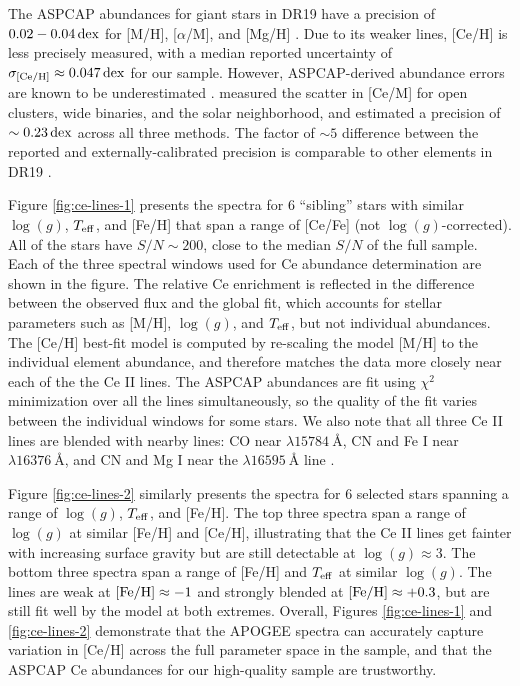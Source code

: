 \documentclass[twocolumn,twocolappendix]{aastex701}
\newcommand{\bracket}[2][H]{{\rm [#2/#1]}}
\newcommand{\dex}{\,{\rm dex}}
\begin{document}
The ASPCAP abundances for giant stars in DR19 have a precision of $0.02-0.04\dex$ for [M/H], [$\alpha$/M], and [Mg/H] \citep{meszaros_sdss-v_2025}. Due to its weaker lines, [Ce/H] is less precisely measured, with a median reported uncertainty  of $\sigma_{\bracket{Ce}}\approx0.047\dex$ for our sample. However, ASPCAP-derived abundance errors are known to be underestimated \citep[see][]{pinsonneault_apokasc-3_2025}. \citet{meszaros_sdss-v_2025} measured the scatter in [Ce/M] for open clusters, wide binaries, and the solar neighborhood, and estimated a precision of $\sim0.23\dex$ across all three methods.  The factor of $\sim5$ difference between the reported and externally-calibrated precision is comparable to other elements in DR19 \citep{meszaros_sdss-v_2025}.

Figure \ref{fig:ce-lines-1} presents the spectra for 6 ``sibling'' stars with similar $\log(g)$, $T_{\rm eff}$, and [Fe/H] that span a range of [Ce/Fe] (not $\log(g)$-corrected). All of the stars have $S/N\sim200$, close to the median $S/N$ of the full sample. Each of the three spectral windows used for Ce abundance determination are shown in the figure. The relative Ce enrichment is reflected in the difference between the observed flux and the global fit, which accounts for stellar parameters such as [M/H], $\log(g)$, and $T_{\rm eff}$, but not individual abundances. The [Ce/H] best-fit model is computed by re-scaling the model [M/H] to the individual element abundance, and therefore matches the data more closely near each of the the Ce II lines. The ASPCAP abundances are fit using $\chi^2$ minimization over all the lines simultaneously, so the quality of the fit varies between the individual windows for some stars. We also note that all three Ce II lines are blended with nearby lines: CO near $\lambda\SI{15784}{\angstrom}$, CN and Fe I near $\lambda\SI{16376}{\angstrom}$, and CN and Mg I near the $\lambda\SI{16595}{\angstrom}$ line \citep[][Figure 6]{cunha_adding_2017}.

Figure \ref{fig:ce-lines-2} similarly presents the spectra for 6 selected stars spanning a range of $\log(g)$, $T_{\rm eff}$, and [Fe/H]. The top three spectra span a range of $\log(g)$ at similar [Fe/H] and [Ce/H], illustrating that the Ce II lines get fainter with increasing surface gravity but are still detectable at $\log(g)\approx3$. The bottom three spectra span a range of [Fe/H] and $T_{\rm eff}$ at similar $\log(g)$. The lines are weak at $\bracket{Fe}\approx-1$ and strongly blended at $\bracket{Fe}\approx+0.3$, but are still fit well by the model at both extremes. Overall, Figures \ref{fig:ce-lines-1} and \ref{fig:ce-lines-2} demonstrate that the APOGEE spectra can accurately capture variation in [Ce/H] across the full parameter space in the sample, and that the ASPCAP Ce abundances for our high-quality sample are trustworthy.
\end{document}
